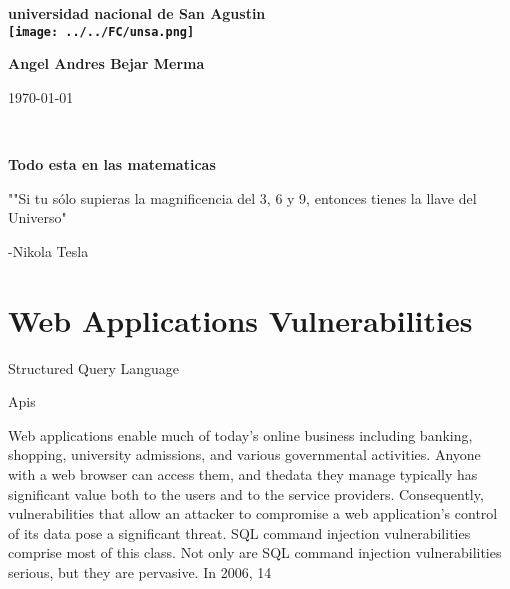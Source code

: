 \documentclass[12pt]{article}
\begin{document}
\begin{center}
\bf{\sc\Huge universidad nacional de San Agustin}\\
\vspace{20pt}
\texttt{[image: ../../FC/unsa.png]} 
\end{center}
\vspace{120pt}
\begin{center}
\bf{\sc\Huge Angel Andres Bejar Merma }\\
\end{center}
\vspace{150pt}
\begin{center}
\bf{\sc\Huge \today\par }
\end{center}
\begin{center}

\end{center}\
\newpage



\begin{center}

\bf{\sc\Huge Todo esta en las matematicas }\\
\end{center}
\begin{flushleft}
\vspace{25PT}
\large
""Si tu sólo supieras la magnificencia del 3, 6 y 9, entonces tienes la llave del Universo" 


-Nikola Tesla
\end{flushleft}
\vspace{25PT}
\section{ Web Applications Vulnerabilities }
\large


Structured Query Language

Apis

Web applications enable much of today’s online business including
banking, shopping, university admissions, and various governmental activities. Anyone with a web browser can access them, and thedata they manage typically has significant value both to the users and to the service providers. Consequently, vulnerabilities that allow an attacker to compromise a web application’s control of its data pose a significant threat. SQL command injection vulnerabilities 
 comprise most of this class. Not only are SQL command injection vulnerabilities serious, but they are pervasive. In 2006, 14%
\end{document}
